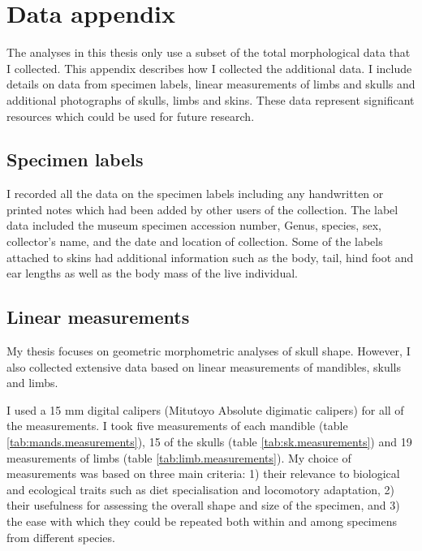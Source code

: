 

\chapter{Data appendix}
\label{appendix}

	The analyses in this thesis only use a subset of the total morphological data that I collected. This appendix describes how I collected the additional data. I include details on data from specimen labels, linear measurements of limbs and skulls and additional photographs of skulls, limbs and skins. These data represent significant resources which could be used for future research.

\section{Specimen labels}

	I recorded all the data on the specimen labels including any handwritten or printed notes which had been added by other users of the collection. The label data included the museum specimen accession number, Genus, species, sex, collector's name, and the date and location of collection. Some of the labels attached to skins had additional information such as the body, tail, hind foot and ear lengths as well as the body mass of the live individual. 
\section{Linear measurements}
\label{sect:measurements}

	My thesis focuses on geometric morphometric analyses of skull shape. However, I also collected extensive data based on linear measurements of mandibles, skulls and limbs. 
	
	I used a 15 mm digital calipers (Mitutoyo Absolute digimatic calipers) for all of the measurements. I took five measurements of each mandible (table \ref{tab:mands.measurements}), 15 of the skulls (table \ref{tab:sk.measurements}) and 19 measurements of limbs (table \ref{tab:limb.measurements}). My choice of  measurements was based on three main criteria: 1) their relevance to biological and ecological traits such as diet specialisation and locomotory adaptation, 2) their usefulness for assessing the overall shape and size of the specimen, and 3) the ease with which they could be repeated both within and among specimens from different species. 

